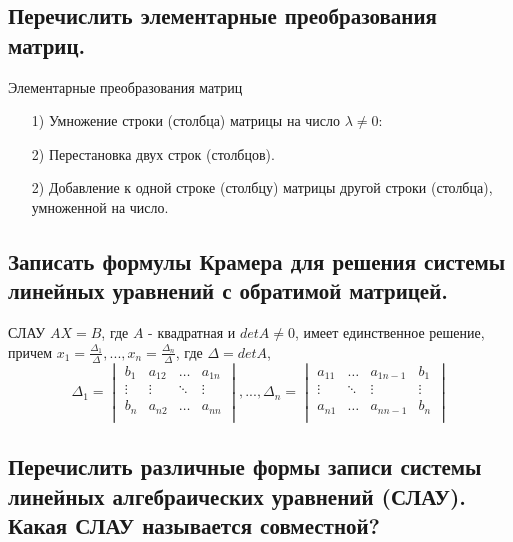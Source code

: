 \subsection{Перечислить элементарные преобразования матриц.}

Элементарные преобразования матриц
\begin{enumerate}
    \item[1)] Умножение строки (столбца) матрицы на число $\lambda \ne 0$:
    \item[2)] Перестановка двух строк (столбцов).
    \item[2)] Добавление к одной строке (столбцу) матрицы другой строки (столбца), умноженной на число.
\end{enumerate}

\subsection{Записать формулы Крамера для решения системы линейных уравнений с обратимой матрицей.}

СЛАУ $AX = B$, где $A$ - квадратная и $detA \ne 0$, имеет единственное решение, причем $x_1 = \frac{\Delta_1}{\Delta}, ..., x_n = \frac{\Delta_n}{\Delta}$, где $\Delta = detA$,
$$\Delta_1 = 
\begin{vmatrix}
    b_1&a_{12}&\ldots&a_{1n}\\
    \vdots&\vdots&\ddots&\vdots\\
    b_n&a_{n2}&\ldots&a_{nn}\\
\end{vmatrix}, ..., 
\Delta_n = 
\begin{vmatrix}
    a_{11}&\ldots&a_{1n-1}&b_1\\
    \vdots&\ddots&\vdots&\vdots\\
    a_{n1}&\ldots&a_{nn-1}&b_n\\
\end{vmatrix}
$$

\subsection{Перечислить различные формы записи системы линейных алгебраических уравнений (СЛАУ). Какая СЛАУ называется совместной?}

